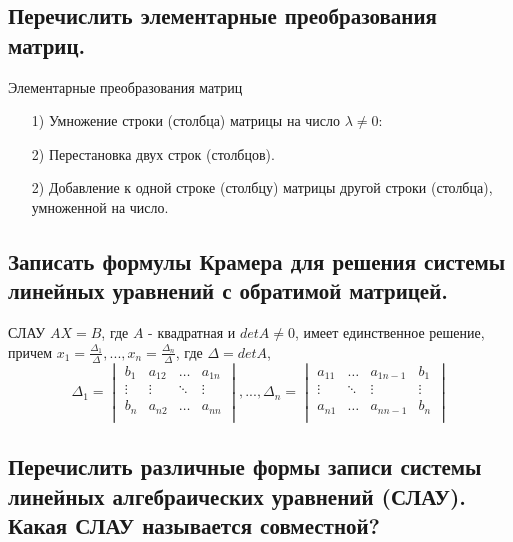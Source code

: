 \subsection{Перечислить элементарные преобразования матриц.}

Элементарные преобразования матриц
\begin{enumerate}
    \item[1)] Умножение строки (столбца) матрицы на число $\lambda \ne 0$:
    \item[2)] Перестановка двух строк (столбцов).
    \item[2)] Добавление к одной строке (столбцу) матрицы другой строки (столбца), умноженной на число.
\end{enumerate}

\subsection{Записать формулы Крамера для решения системы линейных уравнений с обратимой матрицей.}

СЛАУ $AX = B$, где $A$ - квадратная и $detA \ne 0$, имеет единственное решение, причем $x_1 = \frac{\Delta_1}{\Delta}, ..., x_n = \frac{\Delta_n}{\Delta}$, где $\Delta = detA$,
$$\Delta_1 = 
\begin{vmatrix}
    b_1&a_{12}&\ldots&a_{1n}\\
    \vdots&\vdots&\ddots&\vdots\\
    b_n&a_{n2}&\ldots&a_{nn}\\
\end{vmatrix}, ..., 
\Delta_n = 
\begin{vmatrix}
    a_{11}&\ldots&a_{1n-1}&b_1\\
    \vdots&\ddots&\vdots&\vdots\\
    a_{n1}&\ldots&a_{nn-1}&b_n\\
\end{vmatrix}
$$

\subsection{Перечислить различные формы записи системы линейных алгебраических уравнений (СЛАУ). Какая СЛАУ называется совместной?}

